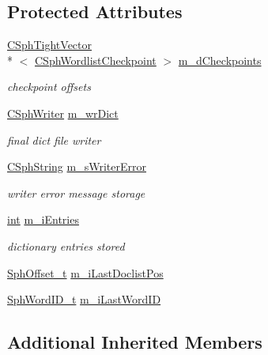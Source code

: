 \subsection*{Protected Attributes}
\begin{DoxyCompactItemize}
\item 
\hyperlink{classCSphTightVector}{C\-Sph\-Tight\-Vector}\\*
$<$ \hyperlink{structCSphWordlistCheckpoint}{C\-Sph\-Wordlist\-Checkpoint} $>$ \hyperlink{structCSphDiskDictTraits_afaf80fefaa07457d5761e738fbea17b0}{m\-\_\-d\-Checkpoints}
\begin{DoxyCompactList}\small\item\em checkpoint offsets \end{DoxyCompactList}\item 
\hyperlink{classCSphWriter}{C\-Sph\-Writer} \hyperlink{structCSphDiskDictTraits_a26d5a54b1e88f3d32123f1d413abbf8c}{m\-\_\-wr\-Dict}
\begin{DoxyCompactList}\small\item\em final dict file writer \end{DoxyCompactList}\item 
\hyperlink{structCSphString}{C\-Sph\-String} \hyperlink{structCSphDiskDictTraits_a0b8b8efb9285052a4afb7b29d7f0c18d}{m\-\_\-s\-Writer\-Error}
\begin{DoxyCompactList}\small\item\em writer error message storage \end{DoxyCompactList}\item 
\hyperlink{sphinxexpr_8cpp_a4a26e8f9cb8b736e0c4cbf4d16de985e}{int} \hyperlink{structCSphDiskDictTraits_af87102e0467a427665052bf14d7a96ac}{m\-\_\-i\-Entries}
\begin{DoxyCompactList}\small\item\em dictionary entries stored \end{DoxyCompactList}\item 
\hyperlink{sphinx_8h_a0fb3b64afebef33c61367714754eaa90}{Sph\-Offset\-\_\-t} \hyperlink{structCSphDiskDictTraits_a3ab5c5e6f9d6f7a448e2035af1cc7804}{m\-\_\-i\-Last\-Doclist\-Pos}
\item 
\hyperlink{sphinx_8h_a80a94d5984fdf9214a98f3e5e65df963}{Sph\-Word\-I\-D\-\_\-t} \hyperlink{structCSphDiskDictTraits_a133b44831f4467b4775e4e341ee8cd49}{m\-\_\-i\-Last\-Word\-I\-D}
\end{DoxyCompactItemize}
\subsection*{Additional Inherited Members}


